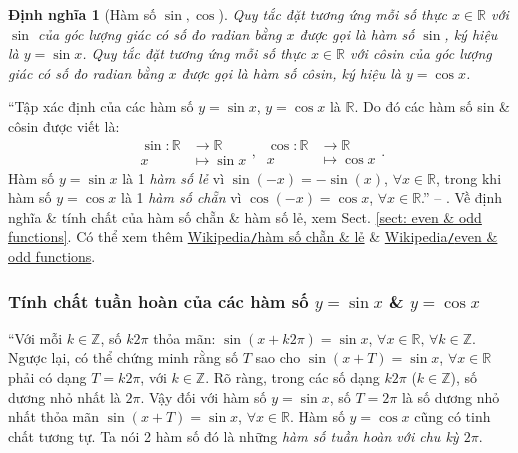 \documentclass[oneside]{book}
\numberwithin{equation}{section}
\newtheorem{dinhnghia}{Định nghĩa}[section]
\begin{document}
\begin{dinhnghia}[Hàm số $\sin,\cos$]
	Quy tắc đặt tương ứng mỗi số thực $x\in\mathbb{R}$ với $\sin$ của góc lượng giác có số đo radian bằng $x$ được gọi là \emph{hàm số $\sin$}, ký hiệu là $y = \sin x$. Quy tắc đặt tương ứng mỗi số thực $x\in\mathbb{R}$ với côsin của góc lượng giác có số đo radian bằng $x$ được gọi là \emph{hàm số côsin}, ký hiệu là $y = \cos x$.
\end{dinhnghia}
``Tập xác định của các hàm số $y = \sin x$, $y = \cos x$ là $\mathbb{R}$. Do đó các hàm số sin \& côsin được viết là:
\begin{equation*}
	\begin{split}
		\sin:\mathbb{R}&\to\mathbb{R}\\
		x&\mapsto\sin x
	\end{split},\ \begin{split}
		\cos:\mathbb{R}&\to\mathbb{R}\\
		x&\mapsto\cos x
	\end{split}.
\end{equation*}
Hàm số $y = \sin x$ là 1 \textit{hàm số lẻ} vì $\sin(-x) = -\sin(x)$, $\forall x\in\mathbb{R}$, trong khi hàm số $y = \cos x$ là 1 \textit{hàm số chẵn} vì $\cos(-x) = \cos x$, $\forall x\in\mathbb{R}$.'' -- \cite[p. 4]{SGK_Toan_11_dai_so_giai_tich_nang_cao}. Về định nghĩa \& tính chất của hàm số chẵn \& hàm số lẻ, xem Sect. \ref{sect: even & odd functions}. Có thể xem thêm \href{https://vi.wikipedia.org/wiki/H%C3%A0m_s%E1%BB%91_ch%E1%BA%B5n_v%C3%A0_l%E1%BA%BB}{Wikipedia\texttt{/}hàm số chẵn \& lẻ} \& \href{https://en.wikipedia.org/wiki/Even_and_odd_functions}{Wikipedia\texttt{/}even \& odd functions}.

\subsubsection{Tính chất tuần hoàn của các hàm số $y = \sin x$ \& $y = \cos x$}
``Với mỗi $k\in\mathbb{Z}$, số $k2\pi$ thỏa mãn: $\sin(x + k2\pi) = \sin x$, $\forall x\in\mathbb{R},\,\forall k\in\mathbb{Z}$. Ngược lại, có thể chứng minh rằng số $T$ sao cho $\sin(x + T) = \sin x$, $\forall x\in\mathbb{R}$ phải có dạng $T = k2\pi$, với $k\in\mathbb{Z}$. Rõ ràng, trong các số dạng $k2\pi$ ($k\in\mathbb{Z}$), số dương nhỏ nhất là $2\pi$. Vậy đối với hàm số $y = \sin x$, số $T = 2\pi$ là số dương nhỏ nhất thỏa mãn $\sin(x + T) = \sin x$, $\forall x\in\mathbb{R}$. Hàm số $y = \cos x$ cũng có tinh chất tương tự. Ta nói 2 hàm số đó là những \textit{hàm số tuần hoàn với chu kỳ $2\pi$}.
\end{document}
